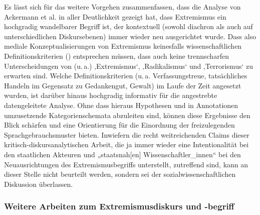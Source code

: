 Es lässt sich für das weitere Vorgehen zusammenfassen, dass die Analyse von Ackermann et al. in aller Deutlichkeit gezeigt hat, dass Extremismus ein hochgradig wandelbarer Begriff ist, der kontextuell (sowohl diachron als auch auf unterschiedlichen Diskursebenen) immer wieder neu ausgerichtet wurde. Dass also mediale Konzeptualisierungen von Extremismus keinesfalls wissenschaftlichen Definitionskriterien () entsprechen müssen, dass auch keine trennscharfen Unterscheidungen von (u.\,a.) ‚Extremismus`, ‚Radikalismus` und ‚Terrorismus` zu erwarten sind. Welche Definitionskriterien (u.\,a. Verfassungstreue, tatsächliches Handeln im Gegensatz zu Gedankengut, Gewalt) im Laufe der Zeit angesetzt wurden, ist darüber hinaus hochgradig informativ für die angestrebte datengeleitete Analyse. Ohne dass hieraus Hypothesen und in Annotationen umzusetzende Kategorienschemata abzuleiten sind, können diese Ergebnisse den Blick schärfen und eine Orientierung für die Einordnung der freizulegenden Sprachgebrauchsmuster bieten. Inwiefern die recht weitreichenden Claims dieser kritisch-diskursanalytischen Arbeit, die ja immer wieder eine Intentionalität bei den staatlichen Akteuren und „staatsnah{[}en{]} Wissenschaftler\_innen`` \autocite[236]{ackermannMetamorphosenExtremismusbegriffesDiskursanalytische2015} bei den Neuausrichtungen des Extremismusbegriffs unterstellt, zutreffend sind, kann an dieser Stelle nicht beurteilt werden, sondern sei der sozialwissenschaftlichen Diskussion überlassen.

\subsubsection{\texorpdfstring{Weitere Arbeiten zum Extremismusdiskurs und -begriff }{Weitere Arbeiten zum Extremismusdiskurs und -begriff }}\label{weitere-arbeiten-zum-extremismusdiskurs-und--begriff}

